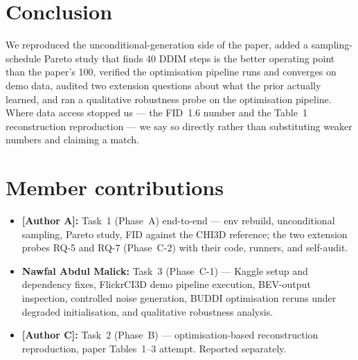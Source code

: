 \documentclass[10pt]{article}
\begin{document}
\section{Conclusion}

We reproduced the unconditional-generation side of the paper, added a sampling-schedule Pareto study that finds 40 DDIM steps is the better operating point than the paper's 100, verified the optimisation pipeline runs and converges on demo data, audited two extension questions about what the prior actually learned, and ran a qualitative robustness probe on the optimisation pipeline. Where data access stopped us --- the FID~1.6 number and the Table~1 reconstruction reproduction --- we say so directly rather than substituting weaker numbers and claiming a match.

\section*{Member contributions}

\begin{itemize}
    \item \textbf{[Author A]:} Task~1 (Phase~A) end-to-end --- env rebuild, unconditional sampling, Pareto study, FID against the CHI3D reference; the two extension probes RQ-5 and RQ-7 (Phase~C-2) with their code, runners, and self-audit.
    \item \textbf{Nawfal Abdul Malick:} Task~3 (Phase~C-1) --- Kaggle setup and dependency fixes, FlickrCI3D demo pipeline execution, BEV-output inspection, controlled noise generation, BUDDI optimisation reruns under degraded initialisation, and qualitative robustness analysis.
    \item \textbf{[Author C]:} Task~2 (Phase~B) --- optimisation-based reconstruction reproduction, paper Tables~1--3 attempt. Reported separately.
\end{itemize}



\end{document}
